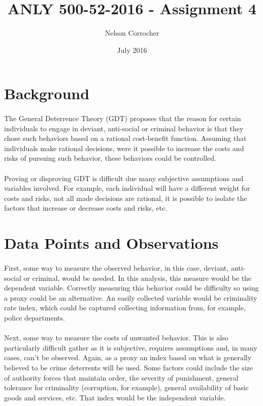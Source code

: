 \documentclass[11pt, a4paper]{article}
\title{ANLY 500-52-2016 - Assignment 4}
\author{Nelson Corrocher}
\date{July 2016}
\begin{document}
\maketitle
\section{Background}
\paragraph{}The General Deterrence Theory (GDT) proposes that the reason for certain individuals to engage in deviant, anti-social or criminal behavior is that they chose such behaviors based on a rational cost-benefit function. Assuming that individuals make rational decisions, were it possible to increase the costs and risks of pursuing such behavior, these behaviors could be controlled.
\paragraph{}Proving or disproving GDT is difficult due many subjective assumptions and variables involved. For example, each individual will have a different weight for costs and risks, not all made decisions are rational, it is possible to isolate the factors that increase or decrease costs and risks, etc.

\section{Data Points and Observations}  
\paragraph{}First, some way to measure the observed behavior, in this case, deviant, anti-social or criminal, would be needed. In this analysis, this measure would be the dependent variable. Correctly measuring this behavior could be difficulty so using a proxy could be an alternative. An easily collected variable would be criminality rate index, which could be captured collecting information from, for example, police departments.
\paragraph{}Next, some way to measure the costs of unwanted behavior. This is also particularly difficult gather as it is subjective, requires assumptions and, in many cases, can’t be observed.  Again, as a proxy an index based on what is generally believed to be crime deterrents will be used. Some factors could include the size of authority forces that maintain order, the severity of punishment, general tolerance for criminality (corruption, for example), general availability of basic goods and services, etc. That index would be the independent variable. 
\end{document}
